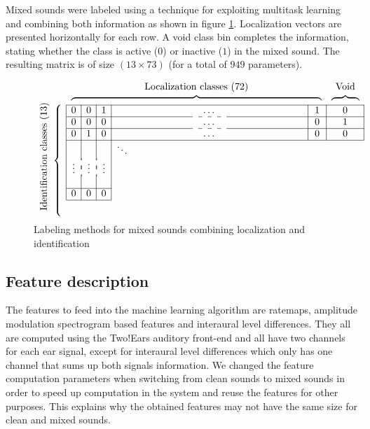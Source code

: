 Mixed sounds were labeled using a technique for exploiting multitask learning and combining both information as shown in figure \ref{fig:methods:label}. Localization vectors are presented horizontally for each row. A void class bin completes the information, stating whether the class is active ($0$) or inactive ($1$) in the mixed sound. The resulting matrix is of size $(13 \times 73)$ (for a total of $949$ parameters).
\begin{figure}[htb]
\[
\newcolumntype{P}[1]{>{\centering\arraybackslash}p{#1}}
\begin{array}{cc|c|c|c|P{2.5cm}P{1cm}P{2.5cm}|c|c|}
& \multicolumn{1}{c}{} & \multicolumn{7}{c}{\text{Localization classes ($72$)}} & \multicolumn{1}{c}{\text{Void}} \\
& \multicolumn{1}{c}{} & \multicolumn{7}{c}{\overbrace{\hphantom{\hspace*{9cm}}}} & \multicolumn{1}{c}{\overbrace{\hphantom{\hspace*{1cm}}}} \\
\cline{3-10}
\parbox[c]{2mm}{\multirow{7}{*}{\rotatebox[origin=c]{90}{Identification classes ($13$)}}} & \multirow{7}{*}{\rotatebox[origin=c]{90}{$\overbrace{\hspace*{4cm}}$}} & 0 & 0 & 1 & & \ldots & & 1 & 0 \\
\cline{3-6}\cdashline{7-7}\cline{8-10}
& & 0 & 0 & 0 & & \ldots & & 0 & 1 \\
\cline{3-6}\cdashline{7-7}\cline{8-10}
& & 0 & 1 & 0 & & \ldots & & 0 & 0 \\
\cline{3-10}
& & & & & \multicolumn{1}{l}{\ddots} & \multicolumn{4}{c}{} \\
& & \multicolumn{1}{c:}{\vdots} & \multicolumn{1}{:c:}{\vdots} & \multicolumn{1}{:c|}{\vdots} & \multicolumn{5}{c}{} \\
& & & & & \multicolumn{5}{c}{} \\
\cline{3-5}
& & 0 & 0 & 0 & \multicolumn{5}{c}{} \\
\cline{3-5} \\
\end{array}
\]
\caption{Labeling methods for mixed sounds combining localization and identification}
\label{fig:methods:label}
\end{figure}

\subsection{Feature description}

The features to feed into the machine learning algorithm are ratemaps, amplitude modulation spectrogram based features and interaural level differences. They all are computed using the Two!Ears auditory front-end \parencite{schymuratwo} and all have two channels for each ear signal, except for interaural level differences which only has one channel that sums up both signals information. We changed the feature computation parameters when switching from clean sounds to mixed sounds in order to speed up computation in the system and reuse the features for other purposes. This explains why the obtained features may not have the same size for clean and mixed sounds.


